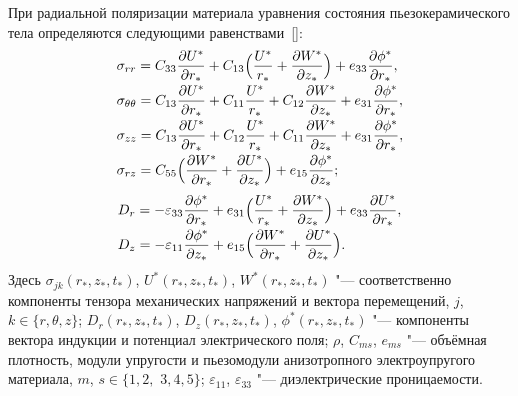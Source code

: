 При радиальной поляризации материала уравнения состояния пьезокерамического тела определяются следующими равенствами~[]:
\begin{equation}
\label{sl:eq2}
\begin{array}{l}
\displaystyle
\sigma _{rr} =C_{33} \frac{\partial U^*  }{\partial r_*  }+C_{13} \Bigl( 
\frac{U^*  }{r_*  }+\frac{\partial W^*  }{\partial z_*  }
\Bigr)+e_{33} \frac{\partial \phi ^*  }{\partial r_*  }, \vspace{1mm}
\\
\displaystyle
\sigma _{\theta \theta } =C_{13} \frac{\partial U^*  }{\partial r_*  
}+C_{11} \frac{U^*  }{r_*  }+C_{12} \frac{\partial W^*  }{\partial 
z_*  }+e_{31} \frac{\partial \phi ^*  }{\partial r_*  }, \vspace{1mm}
\\
\displaystyle
\sigma _{zz} =C_{13} \frac{\partial U^*  }{\partial r_*  }+C_{12} 
\frac{U^*  }{r_*  }+C_{11} \frac{\partial W^*  }{\partial z_*  
}+e_{31} \frac{\partial \phi ^*  }{\partial r_*  }, \vspace{1mm}
\\
\displaystyle
\sigma _{rz} =C_{55} \Bigl( \frac{\partial W^*  }{\partial r_*  
}+\frac{\partial U^*  }{\partial z_*  } \Bigr)+e_{15} \frac{\partial 
\phi ^*  }{\partial z_*  };
\end{array}
\end{equation}
\begin{equation}
\label{sl:eq3}
\begin{array}{l}
\displaystyle
D_r =-\varepsilon _{33} \frac{\partial \phi ^*  }{\partial r_*  }+e_{31} 
\Bigl( \frac{U^*  }{r_*  }+\frac{\partial W^*  }{\partial z_*  } \Bigr)+e_{33} \frac{\partial U^*  }{\partial r_*  }, \vspace{1mm}
\\
\displaystyle
D_z =-\varepsilon _{11} \frac{\partial \phi ^*  }{\partial z_*  }+e_{15} 
\Bigl(\frac{\partial W^*  }{\partial r_*  }+\frac{\partial U^*   }{\partial z_*  } \Bigr).
\end{array}
\end{equation}
Здесь $\sigma _{jk} (r_* , z_* , t_*  )$, $U^* (r_* , z_* , t_* )$, $W^*  (r_* , z_* , t_* )$ "--- соответственно компоненты тензора 
механических напряжений и вектора перемещений, $j$, $k\in \{r, \theta, z \}$; 
$D_r (r_*, z_*, t_* )$, $D_z(r_*, z_*, t_*)$, $\phi ^*  (r_*  , z_*  , t_*  )$ "--- компоненты вектора индукции и потенциал электрического поля;
$\rho$, $C_{ms}$, $e_{ms}$ "--- объёмная плотность, модули упругости и пьезомодули анизотропного электроупругого материала,
$m$, $s\in\{1, 2,$ $3, 4, 5\}$; $\varepsilon _{11}$, $\varepsilon _{33} $ "--- диэлектрические проницаемости.

